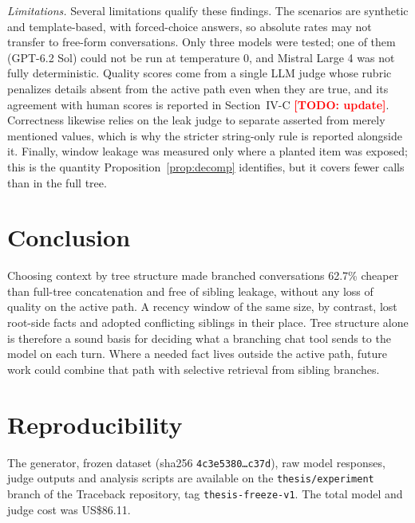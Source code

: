 \documentclass[conference]{IEEEtran}
\theoremstyle{definition}
\newcommand{\todo}[1]{\textcolor{red}{\textbf{[TODO: #1]}}}
\begin{document}
\textit{Limitations.} Several limitations qualify these findings. The scenarios are synthetic and template-based, with forced-choice answers, so absolute rates may not transfer to free-form conversations. Only three models were tested; one of them (GPT-6.2 Sol) could not be run at temperature 0, and Mistral Large 4 was not fully deterministic. Quality scores come from a single LLM judge whose rubric penalizes details absent from the active path even when they are true, and its agreement with human scores is reported in Section~IV-C \todo{update}. Correctness likewise relies on the leak judge to separate asserted from merely mentioned values, which is why the stricter string-only rule is reported alongside it. Finally, window leakage was measured only where a planted item was exposed; this is the quantity Proposition~\ref{prop:decomp} identifies, but it covers fewer calls than in the full tree.

\section{Conclusion}

Choosing context by tree structure made branched conversations 62.7\% cheaper than full-tree concatenation and free of sibling leakage, without any loss of quality on the active path. A recency window of the same size, by contrast, lost root-side facts and adopted conflicting siblings in their place. Tree structure alone is therefore a sound basis for deciding what a branching chat tool sends to the model on each turn. Where a needed fact lives outside the active path, future work could combine that path with selective retrieval from sibling branches.

\section*{Reproducibility}
The generator, frozen dataset (sha256 \texttt{4c3e5380\ldots c37d}), raw model responses, judge outputs and analysis scripts are available on the \texttt{thesis/experiment} branch of the Traceback repository, tag \texttt{thesis-freeze-v1}. The total model and judge cost was US\$86.11.

\end{document}

